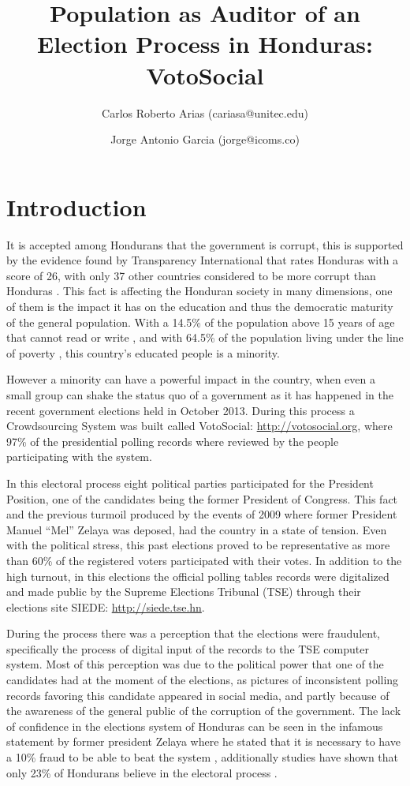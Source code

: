 \documentclass[a4paper,10pt]{article}
\title{Population as Auditor of an Election Process in Honduras: VotoSocial}
\author[1,2]{Carlos Roberto Arias (cariasa@unitec.edu)}
\author[1,3]{Jorge Antonio Garcia (jorge@icoms.co)}
\affil[1]{Facultad de Ingenier\'{i}a, UNITEC, Tegucigalpa, Honduras}
\affil[2]{Instituto de Investigaci\'{o}n de Pol\'{i}ticas P\'{u}blicas, UNITEC, Tegucigalpa, Honduras}
\affil[3]{Icoms Technologies S de RL, Tegucigalpa, Honduras}
\begin{document}
\maketitle

\begin{abstract}

\end{abstract}

\section{Introduction}
It is accepted among Hondurans that the government is corrupt, this is supported by the evidence found by Transparency International that rates Honduras with a score of 26, with only 37 other countries considered to be more corrupt than Honduras \citep{transp}. This fact is affecting the Honduran society in many dimensions, one of them is the impact it has on the education and thus the democratic maturity of the general population. With a 14.5\% of the population above 15 years of age that cannot read or write \citep{bchrep}, and with 64.5\% of the population living under the line of poverty \citep{wbdata}, this country's educated people is a minority.


However a minority can have a powerful impact in the country, when even a small group can shake the status quo of a government \citep{saadia2014} as it has happened in the recent government elections held in October 2013. During this process a Crowdsourcing System was built called VotoSocial: \url{http://votosocial.org}, where 97\% of the presidential polling records where reviewed by the people participating with the system.

In this electoral process eight political parties participated for the President Position, one of the candidates being the former President of Congress. This fact and the previous turmoil produced by the events of 2009 where former President Manuel “Mel” Zelaya was deposed, had the country in a state of tension. Even with the political stress, this past elections proved to be representative as more than 60\% of the registered voters participated with their votes. In addition to the high turnout, in this elections the official polling tables records were digitalized and made public by the Supreme Elections Tribunal (TSE) through their elections site SIEDE: \url{http://siede.tse.hn}.

During the process there was a perception that the elections were fraudulent, specifically the process of digital input of the records to the TSE computer system. Most of this perception was due to the political power that one of the candidates had at the moment of the elections, as pictures of inconsistent polling records favoring this candidate appeared in social media, and partly because of the awareness of the general public of the corruption of the government. The lack of confidence in the elections system of Honduras can be seen in the infamous statement by former president Zelaya where he stated that it is necessary to have a 10\% fraud to be able to beat the system \citep{melvid}, additionally studies have shown that only 23\% of Hondurans believe in the electoral process \citep{romero2014}.
\end{document}
